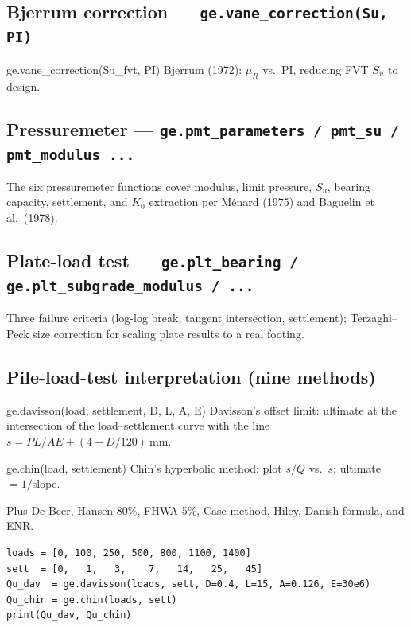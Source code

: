 \documentclass[11pt,a4paper,openany]{book}
\begin{document}
\subsection{Bjerrum correction --- \texttt{ge.vane\_correction(Su, PI)}}

\begin{funcbox}{ge.vane\_correction(Su\_fvt, PI)}
Bjerrum (1972): $\mu_R$ vs.\ PI, reducing FVT $S_u$ to design.
\end{funcbox}

\subsection{Pressuremeter --- \texttt{ge.pmt\_parameters / pmt\_su / pmt\_modulus ...}}

The six pressuremeter functions cover modulus, limit pressure,
$S_u$, bearing capacity, settlement, and $K_0$ extraction per
M\'enard (1975) and Baguelin et al.\ (1978).

\subsection{Plate-load test --- \texttt{ge.plt\_bearing / ge.plt\_subgrade\_modulus / ...}}

Three failure criteria (log-log break, tangent intersection,
settlement); Terzaghi--Peck size correction for scaling plate
results to a real footing.

\subsection{Pile-load-test interpretation (nine methods)}

\begin{funcbox}{ge.davisson(load, settlement, D, L, A, E)}
Davisson's offset limit: ultimate at the intersection of the
load--settlement curve with the line
$s = PL/AE + (4 + D/120)~\text{mm}$.
\end{funcbox}

\begin{funcbox}{ge.chin(load, settlement)}
Chin's hyperbolic method: plot $s/Q$ vs.\ $s$; ultimate $= 1/$slope.
\end{funcbox}

Plus De Beer, Hansen 80\%, FHWA 5\%, Case method, Hiley,
Danish formula, and ENR.

\begin{lstlisting}
loads = [0, 100, 250, 500, 800, 1100, 1400]
sett  = [0,   1,   3,    7,   14,   25,   45]
Qu_dav  = ge.davisson(loads, sett, D=0.4, L=15, A=0.126, E=30e6)
Qu_chin = ge.chin(loads, sett)
print(Qu_dav, Qu_chin)
\end{lstlisting}
\end{document}
